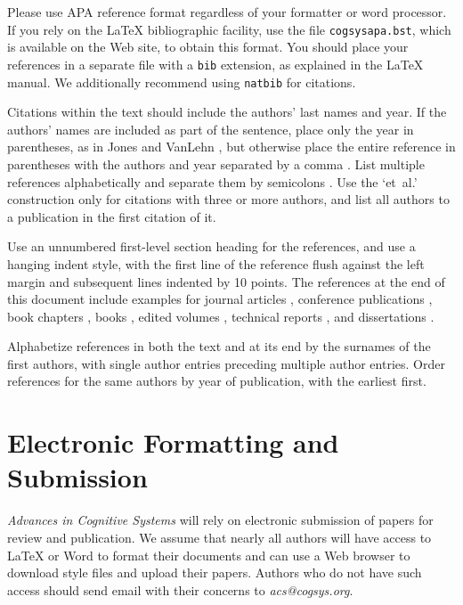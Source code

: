 \documentclass[11pt,letterpaper]{article}
\begin{document}
Please use APA reference format regardless of your formatter or word
processor. If you rely on the \LaTeX\/ bibliographic facility, use the 
file {\tt\small cogsysapa.bst}, which is available on the Web site, to 
obtain this format. You should place your references in a separate file 
with a {\tt\small bib} extension, as explained in the \LaTeX\/ manual.
We additionally recommend using {\tt\small natbib} for citations.

Citations within the text should include the authors' last names and
year. If the authors' names are included as part of the sentence, place 
only the year in parentheses, as in Jones and VanLehn 
\citeyearpar{article-jones-vanlehn}, but 
otherwise place the entire reference in parentheses with the authors
and year separated by a comma \citep{article-jones-vanlehn}. 
List multiple references alphabetically and separate them by semicolons 
\citep{paper-laird-etal,book-newell-simon}. Use the 
`et~al.'  construction only for citations with three or more authors, 
and list all authors to a publication in the first citation of it.

Use an unnumbered first-level section heading for the references, and 
use a hanging indent style, with the first line of the reference flush
against the left margin and subsequent lines indented by 10 points. 
The references at the end of this document include examples for journal
articles \citep{article-forbus}, conference publications \citep{paper-laird-etal},
book chapters \citep{in-book-vanlehn}, books \citep{book-newell-simon}, 
edited volumes \citep{book-shrager-langley}, technical reports 
\citep{techreport-shapiro-etal}, and dissertations \citep{phd-choi}.

Alphabetize references in both the text and at its end by the surnames
of the first authors, with single author entries preceding multiple
author entries. Order references for the same authors by year of
publication, with the earliest first.

\section{Electronic Formatting and Submission}

{\it Advances in Cognitive Systems\/} will rely on electronic submission 
of papers for review and publication. We assume that nearly all authors 
will have access to \LaTeX\/ or Word to format their documents and can
use a Web browser to download style files and upload their papers. 
Authors who do not have such access should send email with their
concerns to {\sl acs@cogsys.org}.
\end{document}
